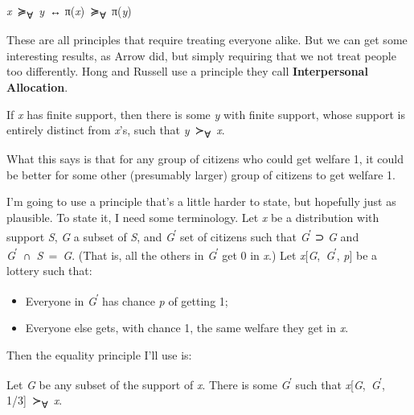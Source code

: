 \documentclass[
  11pt,
  letterpaper,
  DIV=11,
  numbers=noendperiod,
  twoside]{scrartcl}
\providecommand{\tightlist}{%
  \setlength{\itemsep}{0pt}\setlength{\parskip}{0pt}}
\begin{document}
\begin{description}
\tightlist
\item[Permutation Invariance]
\emph{x}~≽\textsubscript{∀}~\emph{y}~↔︎
π(\emph{x})~≽\textsubscript{∀}~π(\emph{y})
\end{description}

These are all principles that require treating everyone alike. But we
can get some interesting results, as Arrow did, but simply requiring
that we not treat people too differently. Hong and Russell use a
principle they call \textbf{Interpersonal Allocation}.

\begin{description}
\tightlist
\item[Interpersonal Allocation]
If \emph{x} has finite support, then there is some \emph{y} with finite
support, whose support is entirely distinct from \emph{x}'s, such that
\emph{y}~≻\textsubscript{∀}~\emph{x}.
\end{description}

What this says is that for any group of citizens who could get welfare
1, it could be better for some other (presumably larger) group of
citizens to get welfare 1.

I'm going to use a principle that's a little harder to state, but
hopefully just as plausible. To state it, I need some terminology. Let
\emph{x} be a distribution with support \emph{S}, \emph{G} a subset of
\emph{S}, and \emph{G}\textsuperscript{′} set of citizens such that
\emph{G}\textsuperscript{′} ⊃ \emph{G} and
\emph{G}\textsuperscript{′}~∩~\emph{S}~=~\emph{G}. (That is, all the
others in \emph{G}\textsuperscript{′} get 0 in \emph{x}.) Let
\emph{x}{[}\emph{G},~\emph{G}\textsuperscript{′}, \emph{p}{]} be a
lottery such that:

\begin{itemize}
\tightlist
\item
  Everyone in \emph{G}\textsuperscript{′} has chance \emph{p} of getting
  1;
\item
  Everyone else gets, with chance 1, the same welfare they get in
  \emph{x}.
\end{itemize}

Then the equality principle I'll use is:

\begin{description}
\tightlist
\item[Stochastic Interpersonal Allocation]
Let \emph{G} be any subset of the support of \emph{x}. There is some
\emph{G}\textsuperscript{′} such that
\emph{x}{[}\emph{G},~\emph{G}\textsuperscript{′},
1/3{]}~≻\textsubscript{∀}~\emph{x}.
\end{description}
\end{document}
